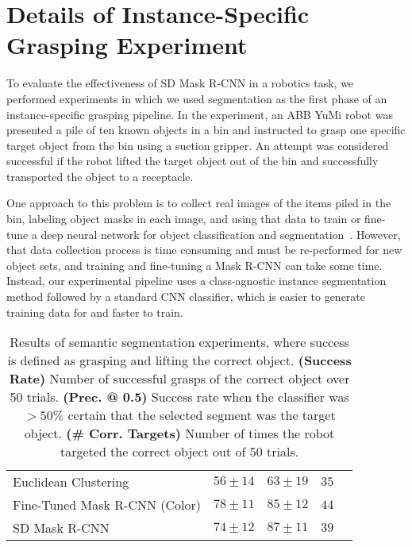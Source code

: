 \documentclass[letterpaper, 10 pt, conference]{ieeeconf}  \pdfoutput=1
\numberwithin{equation}{section}
\begin{document}
\section{Details of Instance-Specific Grasping Experiment}
To evaluate the effectiveness of SD Mask R-CNN in a robotics task, we performed experiments in which we used segmentation as the first phase of an instance-specific grasping pipeline.
In the experiment, an ABB YuMi robot was presented a pile of ten known objects in a bin and instructed to grasp one specific target object from the bin using a suction gripper.
An attempt was considered successful if the robot lifted the target object out of the bin and successfully transported the object to a receptacle.

One approach to this problem is to collect real images of the items piled in the bin, labeling object masks in each image, and using that data to train or fine-tune a deep neural network for object classification and segmentation~\cite{morrison2017cartman, schwarz2017nimbro}.
However, that data collection process is time consuming and must be re-performed for new object sets, and training and fine-tuning a Mask R-CNN can take some time.
Instead, our experimental pipeline uses a class-agnostic instance segmentation method followed by a standard CNN classifier, which is easier to generate training data for and faster to train.

\begin{table*}[ht!]
    \setlength\tabcolsep{4pt}
    \begin{tabularx}{\linewidth}{*{1}{l}*{4}{Z}}
        \toprule
          &   &  &  \\\midrule
        Euclidean Clustering    & $56\pm14$ & $63\pm19$ & $35$ \\
        Fine-Tuned Mask R-CNN (Color)  & $78\pm11$ & $85\pm12$ & $44$ \\
        SD Mask R-CNN              & $74\pm12$ & $87\pm11$ & $39$\\  
        \bottomrule
    \end{tabularx}
    \caption{Results of semantic segmentation experiments, where success is defined as grasping and lifting the correct object. \textbf{(Success Rate)} Number of successful grasps of the correct object over 50 trials.  \textbf{(Prec. @ 0.5)} Success rate when the classifier was $>50\%$ certain that the selected segment was the target object. \textbf{(\# Corr. Targets)} Number of times the robot targeted the correct object out of 50 trials.}
    \label{tab:phys_results}
\end{table*}
\end{document}
